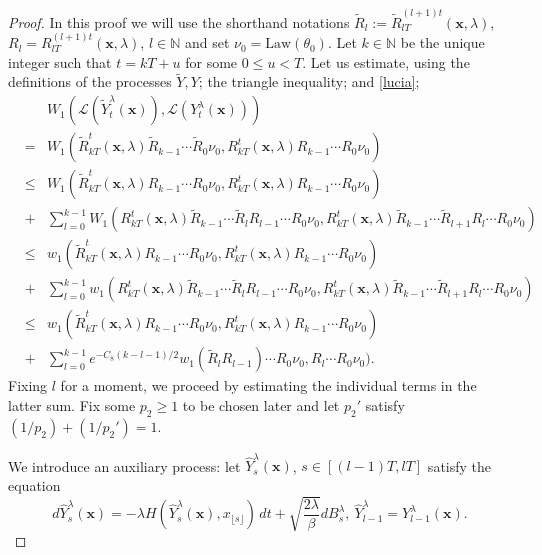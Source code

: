 \documentclass[a4paper,draft]{article}
\begin{document}
\begin{proof} In this proof
we will use the shorthand notations $\tilde{R}_l:=\tilde{R}_{lT}^{(l+1)t}(\mathbf{x},\lambda)$,
$R_l={R}_{lT}^{(l+1)t}(\mathbf{x},\lambda)$, $l\in\mathbb{N}$
and set $\nu_0=\mathrm{Law}(\theta_0)$.
Let $k\in\mathbb{N}$ be the unique integer such that $t=kT+u$ for some
$0\leq u<T$. Let us estimate, using the definitions of the processes $\tilde{Y},Y$;
the triangle inequality; and \eqref{lucia};
\begin{eqnarray*}
& & W_1(\mathcal{L}(\tilde{Y}^{\lambda}_t(\mathbf{x})),
\mathcal{L}(Y^{\lambda}_t(\mathbf{x})))\\
&=& W_1(\tilde{R}^{t}_{kT}(\mathbf{x},\lambda)\tilde{R}_{k-1}\cdots \tilde{R}_0\nu_0,
{R}^{t}_{kT}(\mathbf{x},\lambda)R_{k-1}\cdots R_0\nu_0)\\
&\leq& W_1(\tilde{R}^{t}_{kT}(\mathbf{x},\lambda){R}_{k-1}\cdots R_0
\nu_0,
{R}^{t}_{kT}(\mathbf{x},\lambda){R}_{k-1}\cdots R_0\nu_0)\\ &+& \sum_{l=0}^{k-1}
W_1({R}^{t}_{kT}(\mathbf{x},\lambda)\tilde{R}_{k-1}\cdots \tilde{R}_l
R_{l-1}\cdots R_0
\nu_0,
{R}^{t}_{kT}(\mathbf{x},\lambda)\tilde{R}_{k-1}\cdots \tilde{R}_{l+1}
R_{l}\cdots R_0\nu_0)\\
&\leq& w_1(\tilde{R}^{t}_{kT}(\mathbf{x},\lambda){R}_{k-1}\cdots R_0
\nu_0,
{R}^{t}_{kT}(\mathbf{x},\lambda){R}_{k-1}\cdots R_0\nu_0)\\ &+& \sum_{l=0}^{k-1}
w_1({R}^{t}_{kT}(\mathbf{x},\lambda)\tilde{R}_{k-1}\cdots \tilde{R}_l
R_{l-1}\cdots R_0
\nu_0,
{R}^{t}_{kT}(\mathbf{x},\lambda)\tilde{R}_{k-1}\cdots \tilde{R}_{l+1}
R_{l}\cdots R_0\nu_0)\\
&\leq& w_1(\tilde{R}^{t}_{kT}(\mathbf{x},\lambda){R}_{k-1}\cdots R_0
\nu_0,
{R}^{t}_{kT}(\mathbf{x},\lambda){R}_{k-1}\cdots R_0\nu_0)\\ &+&
\sum_{l=0}^{k-1} e^{-C_8(k-l-1)/2}
w_1(\tilde{R}_lR_{l-1})\cdots R_0
\nu_0,{R}_{l}
\cdots {R}_0\nu_0).
\end{eqnarray*}
Fixing $l$ for a moment, we proceed by estimating the individual terms in the latter sum.
Fix some $p_2\geq 1$ to be chosen later and let $p_2'$ satisfy $(1/p_2)+(1/p_2')=1$.

We introduce an auxiliary process: let
$\hat{Y}^{\lambda}_s(\mathbf{x})$, $s\in [(l-1)T,lT]$ satisfy the equation
$$
d\hat{Y}^{\lambda}_s(\mathbf{x})=-\lambda H(\hat{Y}^{\lambda}_s(\mathbf{x}),x_{\lfloor s\rfloor})\, dt+\sqrt{\frac{2\lambda}{\beta}}dB_s^{\lambda},\ \hat{Y}^{\lambda}_{l-1}=Y^{\lambda}_{l-1}(\mathbf{x}).
$$


\end{proof}
\end{document}
